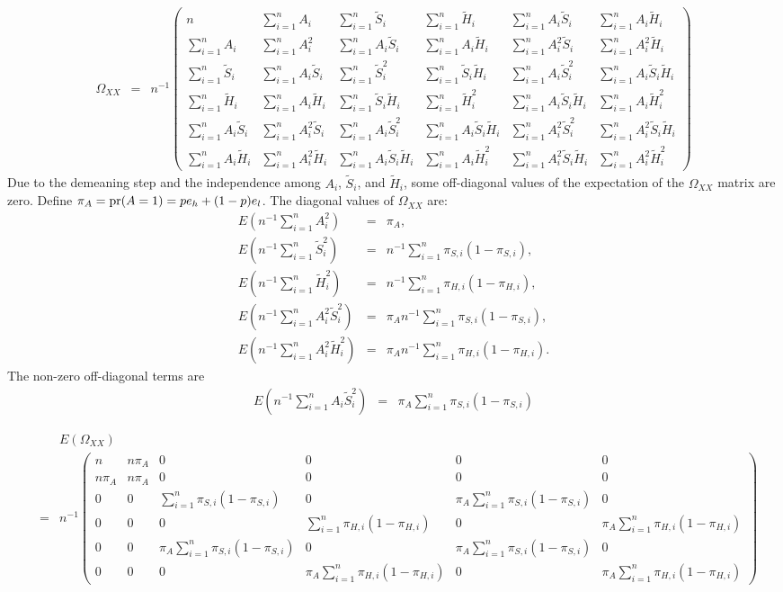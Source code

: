 \documentclass{article}
\newcommand{\pr}{\textup{pr}}
\newcommand{\tS}{\tilde{S}}
\newcommand{\tH}{\tilde{H}}
\newcommand{\sumi}{\sum_{i=1}^n}
\begin{document}
\begin{eqnarray*}
\Omega_{XX} &=& n^{-1}
\begin{pmatrix}
    n & \sumi A_i & \sumi \tS_i & \sumi \tH_i & \sumi A_i \tS_i & \sumi A_i \tH_i \\
    \sumi A_i & \sumi A_i^2 & \sumi A_i \tS_i & \sumi A_i \tH_i & \sumi A_i^2 \tS_i & \sumi A_i^2 \tH_i \\
    \sumi \tS_i & \sumi A_i \tS_i & \sumi \tS_i^2 & \sumi \tS_i \tH_i & \sumi A_i \tS_i^2 & \sumi A_i \tS_i \tH_i \\
    \sumi \tH_i & \sumi A_i \tH_i & \sumi \tS_i \tH_i & \sumi \tH_i^2 & \sumi A_i \tS_i \tH_i & \sumi A_i \tH_i^2 \\
    \sumi A_i \tS_i & \sumi A_i^2 \tS_i & \sumi A_i \tS_i^2 & \sumi A_i \tS_i \tH_i & \sumi A_i^2 \tS_i^2 & \sumi A_i^2 \tS_i \tH_i \\
    \sumi A_i \tH_i & \sumi A_i^2 \tH_i & \sumi A_i \tS_i \tH_i & \sumi A_i \tH_i^2 & \sumi A_i^2 \tS_i \tH_i & \sumi A_i^2 \tH_i^2
\end{pmatrix}
\end{eqnarray*}
Due to the demeaning step and the independence among $A_i$, $\tS_i$, and $\tH_i$, some off-diagonal values of the expectation of the $\Omega_{XX}$ matrix are zero. Define 
$\pi_A = \pr(A = 1) = pe_{h} + (1-p)e_{l}$.
The diagonal values of $\Omega_{XX}$ are:
\begin{eqnarray*}
    E\left(n^{-1} \sumi A_i^2\right) &=& \pi_A, \\
    E\left(n^{-1} \sumi \tS_i^2\right) &=& n^{-1} \sumi \pi_{S,i}(1-\pi_{S,i}), \\
    E\left(n^{-1} \sumi \tH_i^2\right) &=& n^{-1} \sumi \pi_{H,i}(1-\pi_{H,i}), \\
    E\left(n^{-1} \sumi A_i^2 \tS_i^2\right) &=& \pi_A n^{-1} \sumi \pi_{S,i}(1-\pi_{S,i}), \\
    E\left(n^{-1} \sumi A_i^2 \tH_i^2\right) &=& \pi_A n^{-1} \sumi \pi_{H,i}(1-\pi_{H,i}). 
\end{eqnarray*}
The non-zero off-diagonal terms are 
\begin{eqnarray*}
    E\left(n^{-1} \sumi A_i \tS_i^2\right) &=& \pi_A \sumi \pi_{S,i}(1-\pi_{S,i})
\end{eqnarray*}

\begin{eqnarray*}
&& E(\Omega_{XX}) \\
&=& n^{-1}
\begin{pmatrix}
    n & n\pi_A & 0 & 0 & 0 & 0 \\
    n\pi_A & n\pi_A & 0 & 0 & 0 & 0 \\
    0 & 0 & \sumi \pi_{S,i}(1-\pi_{S,i}) & 0 & \pi_A \sumi \pi_{S,i}(1-\pi_{S,i}) & 0 \\
    0 & 0 & 0 & \sumi \pi_{H,i}(1-\pi_{H,i}) & 0 & \pi_A \sumi \pi_{H,i}(1-\pi_{H,i}) \\
    0 & 0 & \pi_A \sumi \pi_{S,i}(1-\pi_{S,i}) & 0 & \pi_A\sumi \pi_{S,i}(1-\pi_{S,i}) & 0 \\
    0 & 0 & 0 & \pi_A \sumi \pi_{H,i}(1-\pi_{H,i}) & 0 & \pi_A \sumi \pi_{H,i}(1-\pi_{H,i})
\end{pmatrix}
\end{eqnarray*}
\end{document}
